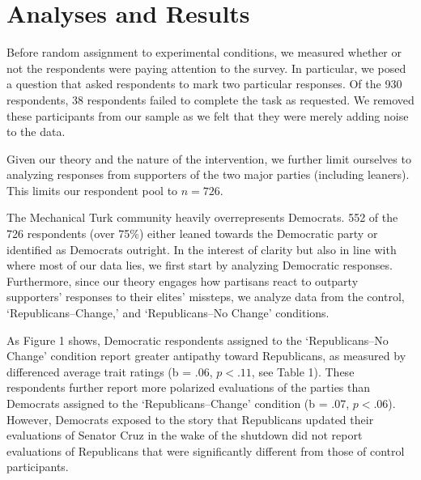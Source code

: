 \documentclass[12pt]{article}
\begin{document}
\section*{Analyses and Results}

Before random assignment to experimental conditions, we measured whether or not the respondents were paying attention to the survey. In particular, we posed a question that asked respondents to mark two particular responses. Of the 930 respondents, 38 respondents failed to complete the task as requested. We removed these participants from our sample as we felt that they were merely adding noise to the data.

Given our theory and the nature of the intervention, we further limit ourselves to analyzing responses from supporters of the two major parties (including leaners). This limits our respondent pool to $n=726$.

The Mechanical Turk community heavily overrepresents Democrats. 552 of the 726 respondents (over 75\%) either leaned towards the
Democratic party or identified as Democrats outright. In the interest of clarity but also in line with where most of our data lies, we first start by analyzing Democratic responses. Furthermore, since our theory engages how partisans react to outparty supporters' responses to their elites' missteps, we analyze data from the control, `Republicans--Change,' and `Republicans--No Change' conditions.

As Figure 1 shows, Democratic respondents assigned to the `Republicans--No Change' condition report greater antipathy toward
Republicans, as measured by differenced average trait ratings (b = .06, $p < .11$, see Table 1). These respondents further report more polarized evaluations of the parties than Democrats assigned to the `Republicans--Change' condition (b = .07, $p < .06$). However, Democrats exposed to the story that Republicans updated their evaluations of Senator Cruz in the wake of the shutdown did not report evaluations of Republicans that were significantly different from those of control participants. 
\end{document}
